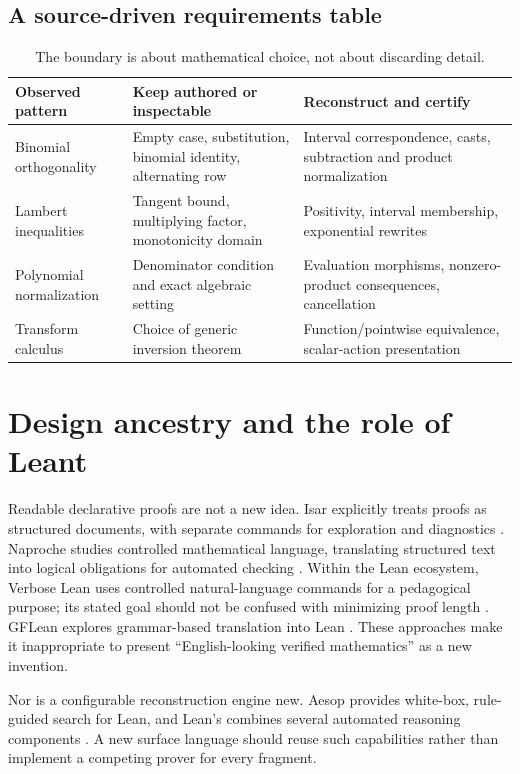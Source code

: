 \documentclass[11pt,a4paper]{article}
\newcommand{\code}[1]{\texttt{\detokenize{#1}}}
\theoremstyle{remark}
\begin{document}
\subsection{A source-driven requirements table}
\begin{table}[htbp]
\centering\small
\begin{tabularx}{\textwidth}{@{}p{}YY@{}}
\toprule
Observed pattern & Keep authored or inspectable & Reconstruct and certify\\
\midrule
Binomial orthogonality & Empty case, substitution, binomial identity, alternating row & Interval correspondence, casts, subtraction and product normalization\\
Lambert inequalities & Tangent bound, multiplying factor, monotonicity domain & Positivity, interval membership, exponential rewrites\\
Polynomial normalization & Denominator condition and exact algebraic setting & Evaluation morphisms, nonzero-product consequences, cancellation\\
Transform calculus & Choice of generic inversion theorem & Function/pointwise equivalence, scalar-action presentation\\
\bottomrule
\end{tabularx}
\caption{The boundary is about mathematical choice, not about discarding detail.}
\end{table}

\section{Design ancestry and the role of Leant}
\label{sec:ancestry}
Readable declarative proofs are not a new idea. Isar explicitly treats proofs as structured documents, with separate commands for exploration and diagnostics \cite{isar}. Naproche studies controlled mathematical language, translating structured text into logical obligations for automated checking \cite{naproche}. Within the Lean ecosystem, Verbose Lean uses controlled natural-language commands for a pedagogical purpose; its stated goal should not be confused with minimizing proof length \cite{verbose}. GFLean explores grammar-based translation into Lean \cite{gflean}. These approaches make it inappropriate to present ``English-looking verified mathematics'' as a new invention.

Nor is a configurable reconstruction engine new. Aesop provides white-box, rule-guided search for Lean, and Lean's \code{grind} combines several automated reasoning components \cite{aesop,grind}. A new surface language should reuse such capabilities rather than implement a competing prover for every fragment.
\end{document}
